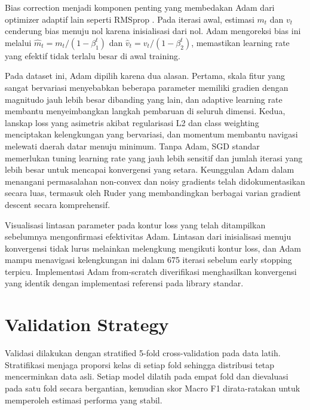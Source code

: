 \documentclass{article}
\begin{document}
Bias correction menjadi komponen penting yang membedakan Adam dari optimizer adaptif lain seperti RMSprop \cite{kingma2015adam}. Pada iterasi awal, estimasi $m_t$ dan $v_t$ cenderung bias menuju nol karena inisialisasi dari nol. Adam mengoreksi bias ini melalui $\hat{m}_t = m_t / (1-\beta_1^t)$ dan $\hat{v}_t = v_t / (1-\beta_2^t)$, memastikan learning rate yang efektif tidak terlalu besar di awal training.

Pada dataset ini, Adam dipilih karena dua alasan. Pertama, skala fitur yang sangat bervariasi menyebabkan beberapa parameter memiliki gradien dengan magnitudo jauh lebih besar dibanding yang lain, dan adaptive learning rate membantu menyeimbangkan langkah pembaruan di seluruh dimensi. Kedua, lanskap loss yang asimetris akibat regularisasi L2 dan class weighting menciptakan kelengkungan yang bervariasi, dan momentum membantu navigasi melewati daerah datar menuju minimum. Tanpa Adam, SGD standar memerlukan tuning learning rate yang jauh lebih sensitif dan jumlah iterasi yang lebih besar untuk mencapai konvergensi yang setara. Keunggulan Adam dalam menangani permasalahan non-convex dan noisy gradients telah didokumentasikan secara luas, termasuk oleh Ruder \cite{ruder2016overview} yang membandingkan berbagai varian gradient descent secara komprehensif.

Visualisasi lintasan parameter pada kontur loss yang telah ditampilkan sebelumnya mengonfirmasi efektivitas Adam. Lintasan dari inisialisasi menuju konvergensi tidak lurus melainkan melengkung mengikuti kontur loss, dan Adam mampu menavigasi kelengkungan ini dalam 675 iterasi sebelum early stopping terpicu. Implementasi Adam from-scratch diverifikasi menghasilkan konvergensi yang identik dengan implementasi referensi pada library standar.

\section{Validation Strategy}

Validasi dilakukan dengan stratified 5-fold cross-validation pada data latih. Stratifikasi menjaga proporsi kelas di setiap fold sehingga distribusi tetap mencerminkan data asli. Setiap model dilatih pada empat fold dan dievaluasi pada satu fold secara bergantian, kemudian skor Macro F1 dirata-ratakan untuk memperoleh estimasi performa yang stabil.
\end{document}
